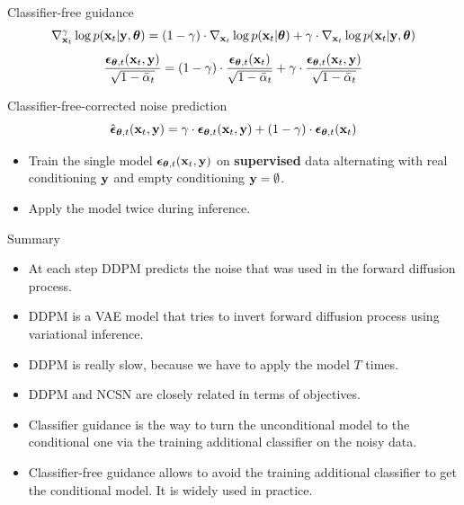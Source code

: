 \begin{frame}{Classifier-free guidance}
	\[
		\nabla_{\mathbf{x}_t}^{\gamma} \log p(\mathbf{x}_t | \mathbf{y}, \boldsymbol{\theta}) =  (1 - \gamma) \cdot  \nabla_{\mathbf{x}_t} \log p(\mathbf{x}_t | \boldsymbol{\theta}) + \gamma \cdot  \nabla_{\mathbf{x}_t} \log p(\mathbf{x}_t| \mathbf{y}, \boldsymbol{\theta})
	\]
	\[
		\frac{\boldsymbol{\epsilon}_{\boldsymbol{\theta}, t}(\mathbf{x}_t, \mathbf{y})}{\sqrt{1 - \bar{\alpha}_t}} = (1 - \gamma) \cdot  \frac{\boldsymbol{\epsilon}_{\boldsymbol{\theta}, t}(\mathbf{x}_t)}{\sqrt{1 - \bar{\alpha}_t}} +  \gamma \cdot \frac{\boldsymbol{\epsilon}_{\boldsymbol{\theta}, t}(\mathbf{x}_t, \mathbf{y})}{\sqrt{1 - \bar{\alpha}_t}} 
	\]
	\begin{block}{Classifier-free-corrected noise prediction}
		\vspace{-0.3cm}
		\[
			\hat{\boldsymbol{\epsilon}}_{\boldsymbol{\theta}, t}(\mathbf{x}_t, \mathbf{y}) = \gamma \cdot \boldsymbol{\epsilon}_{\boldsymbol{\theta}, t}(\mathbf{x}_t, \mathbf{y}) + (1 - \gamma) \cdot \boldsymbol{\epsilon}_{\boldsymbol{\theta}, t}(\mathbf{x}_t)
		\]
		\vspace{-0.5cm}
	\end{block}
	\begin{itemize}
		\item Train the single model $\boldsymbol{\epsilon}_{\boldsymbol{\theta}, t}(\mathbf{x}_t, \mathbf{y})$ on \textbf{supervised} data alternating with real conditioning $\mathbf{y}$ and empty conditioning $\mathbf{y} = \emptyset$.
		\item Apply the model twice during inference.
	\end{itemize}
\end{frame}
\begin{frame}{Summary}
	\begin{itemize}
		\item At each step DDPM predicts the noise that was used in the forward diffusion process. 
		\vfill
		\item DDPM is a VAE model that tries to invert forward diffusion process using variational inference. 
		\vfill
		\item DDPM is really slow, because we have to apply the model $T$ times.
		\vfill
		\item DDPM and NCSN are closely related in terms of objectives.	
		\vfill
		\item Classifier guidance is the way to turn the unconditional model to the conditional one via the training additional classifier on the noisy data.
		\vfill
		\item Classifier-free guidance allows to avoid the training additional classifier to get the conditional model. It is widely used in practice.
	\end{itemize}
\end{frame}
 